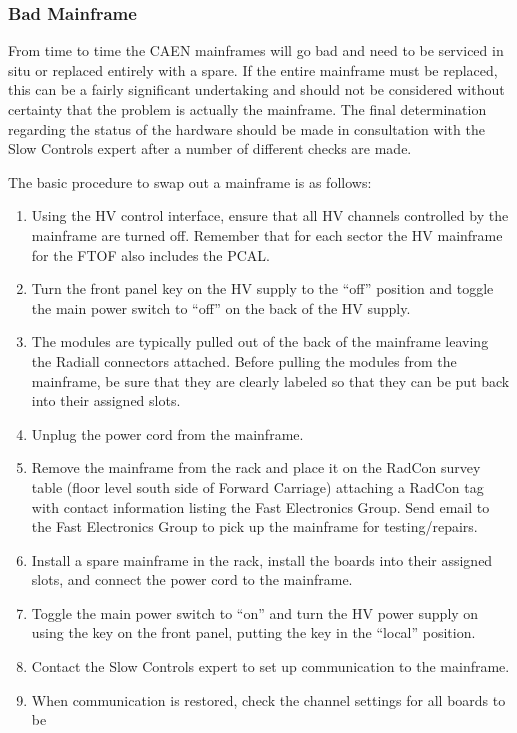 \documentclass[12pt]{article}
\begin{document}
\subsubsection{Bad Mainframe}
\label{mainframe}

From time to time the CAEN mainframes will go bad and need to be serviced in situ or
replaced entirely with a spare. If the entire mainframe must be replaced, this can be
a fairly significant undertaking and should not be considered without certainty that 
the problem is actually the mainframe. The final determination regarding the status of 
the hardware should be made in consultation with the Slow Controls expert after a 
number of different checks are made.

The basic procedure to swap out a mainframe is as follows:

\begin{enumerate}
\item Using the HV control interface, ensure that all HV channels controlled by the
mainframe are turned off. Remember that for each sector the HV mainframe for the FTOF
also includes the PCAL.
\item Turn the front panel key on the HV supply to the ``off'' position and toggle the 
main power switch to ``off'' on the back of the HV supply.
\item The modules are typically pulled out of the back of the mainframe leaving the 
Radiall connectors attached. Before pulling the modules from the mainframe, be sure 
that they are clearly labeled so that they can be put back into their assigned slots.
\item Unplug the power cord from the mainframe.
\item Remove the mainframe from the rack and place it on the RadCon survey table
(floor level south side of Forward Carriage) attaching a RadCon tag with contact
information listing the Fast Electronics Group. Send email to the Fast Electronics
Group to pick up the mainframe for testing/repairs.
\item Install a spare mainframe in the rack, install the boards into their assigned 
slots, and connect the power cord to the mainframe.
\item Toggle the main power switch to ``on'' and turn the HV power supply on using the 
key on the front panel, putting the key in the ``local'' position.
\item Contact the Slow Controls expert to set up communication to the mainframe.
\item When communication is restored, check the channel settings for all boards to be 

\end{enumerate}
\end{document}
